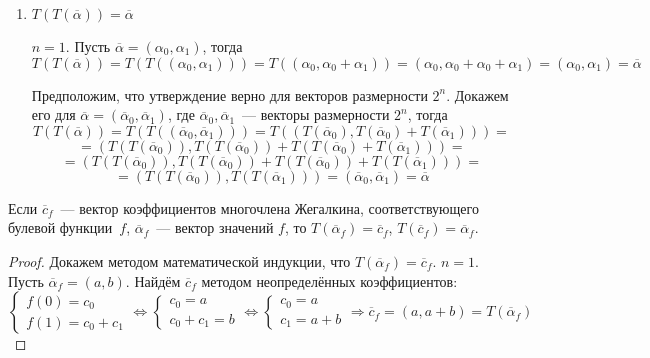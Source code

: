 \begin{enumerate}
\begin{enumerate}
		\item $T(T(\overline\alpha)) = \overline\alpha$
		\begin{proofmathind}
			\indbase $n = 1$.
			Пусть $\overline\alpha = (\alpha_0, \alpha_1)$, тогда
			\begin{equation*}
			T(T(\overline\alpha)) =
			T(T((\alpha_0, \alpha_1))) =
			T((\alpha_0, \alpha_0 + \alpha_1)) =
			(\alpha_0, \alpha_0 + \alpha_0 + \alpha_1) =
			(\alpha_0, \alpha_1) =
			\overline\alpha
			\end{equation*}
			
			\indstep Предположим, что утверждение верно для векторов размерности $2^n$.
			Докажем его для $\overline\alpha = (\overline\alpha_0, \overline\alpha_1)$, где
			$\overline\alpha_0, \overline\alpha_1$~--- векторы размерности $2^n$, тогда
			\begin{equation*}
			T(T(\overline\alpha)) =
			T(T((\overline\alpha_0, \overline\alpha_1))) =
			T((T(\overline\alpha_0), T(\overline\alpha_0) + T(\overline\alpha_1))) =
			\end{equation*}
			\begin{equation*}
			= (T(T(\overline\alpha_0)), T(T(\overline\alpha_0)) + T(T(\overline\alpha_0) + T(\overline\alpha_1))) =
			\end{equation*}
			\begin{equation*}
			= (T(T(\overline\alpha_0)), T(T(\overline\alpha_0)) + T(T(\overline\alpha_0)) + T(T(\overline\alpha_1))) =
			\end{equation*}
			\begin{equation*}
			= (T(T(\overline\alpha_0)), T(T(\overline\alpha_1))) =
			(\overline\alpha_0, \overline\alpha_1) =
			\overline\alpha
			\end{equation*}
			\indend
		\end{proofmathind}
	\end{enumerate}
	
	Если $\overline c_f$~--- вектор коэффициентов многочлена Жегалкина, соответствующего булевой функции~$f$, $\overline\alpha_f$~--- вектор значений $f$, то $T(\overline\alpha_f) = \overline c_f$, $T(\overline c_f) = \overline\alpha_f$.
	\begin{proof}
	Докажем методом математической индукции, что $T(\overline\alpha_f) = \overline c_f$.
		\indbase $n = 1$.
		Пусть $\overline\alpha_f = (a, b)$.
		Найдём $\overline c_f$ методом неопределённых коэффициентов:
		\begin{equation*}
		\begin{cases}
		f(0) = c_0 \\
		f(1) = c_0 + c_1
		\end{cases}
		\Leftrightarrow
		\begin{cases}
		c_0 = a \\
		c_0 + c_1 = b
		\end{cases}
		\Leftrightarrow
		\begin{cases}
		c_0 = a \\
		c_1 = a + b
		\end{cases}
		\Rightarrow
		\overline c_f = (a, a + b) = T(\overline\alpha_f)
		\end{equation*}
		

\end{proof}
\end{enumerate}
